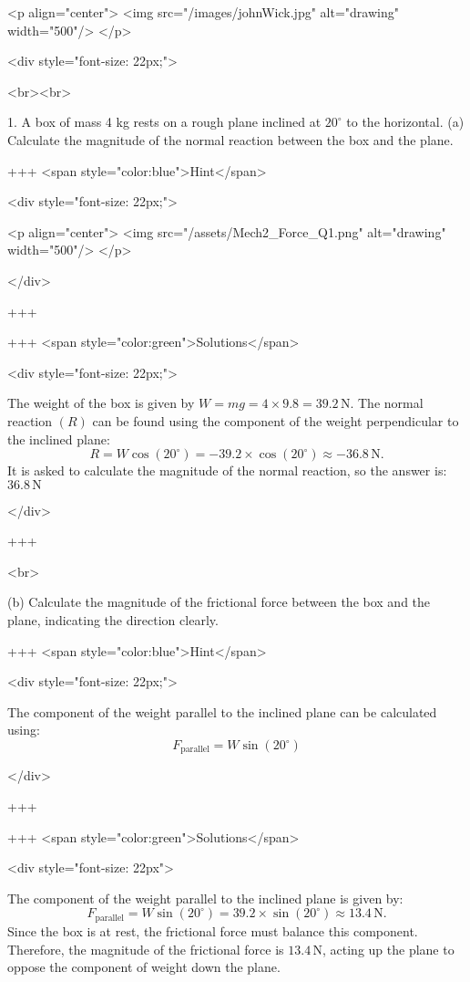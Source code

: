 <p align="center">
<img src="/images/johnWick.jpg" alt="drawing" width="500"/>
</p>

<div style="font-size: 22px;">

<br><br>

1. A box of mass 4 kg rests on a rough plane inclined at $20^{\circ}$ to the horizontal.
(a) Calculate the magnitude of the normal reaction between the box and the plane.

+++ <span style="color:blue">Hint</span>

<div style="font-size: 22px;">

<p align="center">
<img src="/assets/Mech2_Force_Q1.png" alt="drawing" width="500"/>
</p>

</div>

+++

+++ <span style="color:green">Solutions</span>

<div style="font-size: 22px;">

The weight of the box is given by \(W = mg = 4 \times 9.8 = 39.2 \, \text{N}\).
The normal reaction \((R)\) can be found using the component of the weight perpendicular to the inclined plane:
\[R = W \cos(20^\circ) = -39.2 \times \cos(20^\circ) \approx -36.8 \, \text{N}.\]
It is asked to calculate the magnitude of the normal reaction, so the answer is: $36.8 \, \text{N}$

</div>

+++

<br>

(b) Calculate the magnitude of the frictional force between the box and the plane, indicating the direction clearly.

+++ <span style="color:blue">Hint</span>

<div style="font-size: 22px;">

The component of the weight parallel to the inclined plane can be calculated using:
\[F_{\text{parallel}} = W \sin(20^\circ)\]

</div>

+++

+++ <span style="color:green">Solutions</span>

<div style="font-size: 22px">

The component of the weight parallel to the inclined plane is given by:
\[F_{\text{parallel}} = W \sin(20^\circ) = 39.2 \times \sin(20^\circ) \approx 13.4 \, \text{N}.\]
Since the box is at rest, the frictional force must balance this component. Therefore, the magnitude of the frictional force is \(13.4 \, \text{N}\), acting up the plane to oppose the component of weight down the plane.

